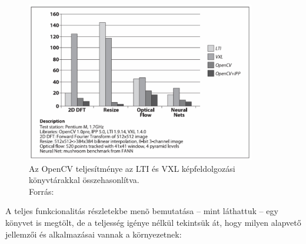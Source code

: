 \begin{figure}[!ht]
\centering
\includegraphics[width=100mm, keepaspectratio]{figures/opencv_speed.png}
\caption{Az OpenCV teljesítménye az LTI és VXL képfeldolgozási könyvtárakkal összehasonlítva.\\Forrás: \cite{opencv_book}}
\label{fig:opencv_speed}
\end{figure}

A teljes funkcionalitás részletekbe menõ bemutatása -- mint láthattuk \cite{opencv_book} -- egy könyvet is megtölt, de a teljesség igénye nélkül tekintsük át, hogy milyen alapvető jellemzői és alkalmazásai vannak a környezetnek:

